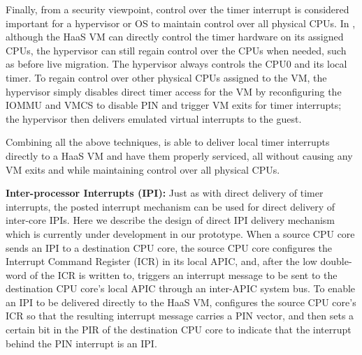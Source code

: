 Finally, from a security viewpoint, control over the timer interrupt is considered important for a hypervisor or OS to maintain control over all physical CPUs.
In \na, although the HaaS VM can directly control the timer hardware on its assigned CPUs, the hypervisor can still regain 
control over the CPUs when needed, such as before live migration. 
The hypervisor always controls the CPU0 and its local timer. 
To regain control over other physical CPUs assigned to the VM, the hypervisor 
simply disables direct timer access for the VM by reconfiguring the IOMMU and VMCS to 
disable PIN and trigger VM exits for timer interrupts; the hypervisor then delivers
emulated virtual interrupts to the guest.

Combining all the above techniques, \na is able to deliver local timer interrupts 
directly to a HaaS VM and have them properly serviced, 
all without causing any VM exits and while maintaining control over all physical CPUs.


{\bf Inter-processor Interrupts (IPI):} 
Just as with direct delivery of timer interrupts, the posted interrupt mechanism can be used for direct delivery of inter-core IPIs.
Here we describe the design of direct IPI delivery mechanism which is currently under development in our prototype.
When a source CPU core sends an IPI to a destination CPU core, the source CPU core configures the Interrupt Command Register (ICR) in its local APIC, 
and, after the low double-word of the ICR is written to, triggers an interrupt message to be sent to the destination CPU core's local APIC through an inter-APIC system bus.
To enable an IPI to be delivered directly to the HaaS VM, \na configures the source CPU core's ICR so that the resulting interrupt message carries a PIN vector,
and then sets a certain bit in the PIR of the destination CPU core to indicate that the interrupt behind the PIN interrupt is an IPI.

 



